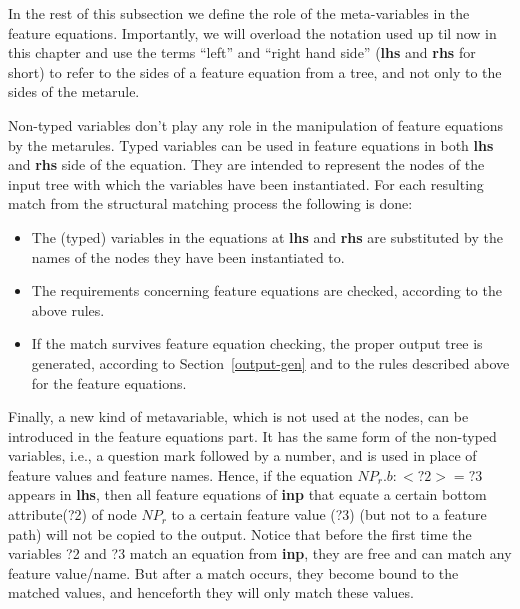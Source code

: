 In the rest of this subsection we define the role of the meta-variables 
in the feature equations. Importantly, we will overload the notation used up
til now in this chapter and use the terms ``left'' and ``right hand
side'' ({\bf lhs} and {\bf rhs} for short) to refer to the sides of a
feature equation from a tree, and not only to the sides of the metarule.

Non-typed variables don't play any role in the manipulation of feature
equations by the metarules.
Typed variables can be used in feature equations in both {\bf lhs} and 
{\bf rhs} side of the equation. 
They are intended to represent the nodes of the input tree with which
the variables have been instantiated. For each resulting match 
from the structural matching process the following is done:

\begin{itemize}
\item   The (typed) variables in the equations at {\bf lhs} and {\bf rhs} are 
        substituted by the names of the nodes they have been instantiated to.

\item   The requirements concerning feature equations are checked, according
        to the above rules.

\item   If the match survives feature equation checking, the proper output tree
        is generated, according to Section~\ref{output-gen} and to the 
        rules described above for the feature equations.
\end{itemize}

Finally, a new kind of metavariable, which is not used at the nodes, can be
introduced in the feature equations part. It has the same form of the
non-typed variables, i.e., a question mark followed by a number, and is used
in place of feature values and feature names. Hence, if the equation
$NP_r.b:<?2> = ?3$ appears in {\bf lhs}, then all feature
equations of {\bf inp} that equate a certain  bottom attribute(?2) of node 
$NP_r$ to a certain feature value (?3) (but not to a feature path) will not 
be copied to the output. Notice that before the first time the variables ?2 
and ?3 match an equation from {\bf inp}, they are free and can match 
any feature
value/name. But after a match occurs, 
they become bound to the matched values, and
henceforth they will only match these values. 

\setcounter{topnumber}{4}
\setcounter{bottomnumber}{4}
\setcounter{totalnumber}{4}

